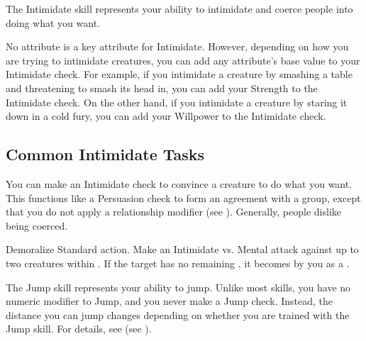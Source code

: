 \newpage
{}
  The Intimidate skill represents your ability to intimidate and coerce people into doing what you want.

  No attribute is a key attribute for Intimidate.
  However, depending on how you are trying to intimidate creatures, you can add any attribute's base value to your Intimidate check.
  For example, if you intimidate a creature by smashing a table and threatening to smash its head in, you can add your Strength to the Intimidate check.
  On the other hand, if you intimidate a creature by staring it down in a cold fury, you can add your Willpower to the Intimidate check.

  \subsection{Common Intimidate Tasks}
     You can make an Intimidate check to convince a creature to do what you want. This functions like a Persuasion check to form an agreement with a group, except that you do not apply a relationship modifier (see ).
    Generally, people dislike being coerced.

    \begin{activeability}{Demoralize}
      \abilityusagetime Standard action.
      \rankline
      Make an Intimidate vs. Mental attack against up to two creatures within \shortrange.
      \hit If the target has no remaining , it becomes \frightened by you as a .
    \end{activeability}

\newpage
{}
  The Jump skill represents your ability to jump.
  Unlike most skills, you have no numeric modifier to Jump, and you never make a Jump check.
  Instead, the distance you can jump changes depending on whether you are trained with the Jump skill.
  For details, see (see ).


